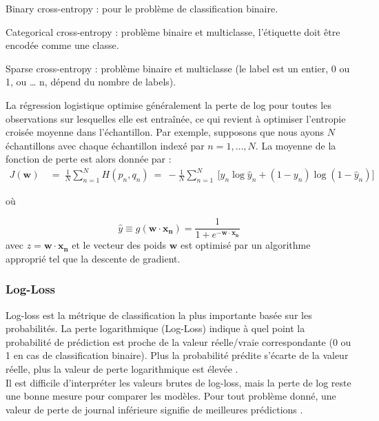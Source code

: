 		\begin{list}{--}{Types d'entropie croisée :}
			\item Binary cross-entropy : pour le problème de classification binaire.
			\item Categorical cross-entropy : problème binaire et multiclasse, l'étiquette doit être encodée comme une classe.
			\item Sparse cross-entropy : problème binaire et multiclasse (le label est un entier, 0 ou 1, ou … n, dépend du nombre de labels).
		\end{list}
		
		
		La régression logistique optimise généralement la perte de log pour toutes les observations sur lesquelles elle est entraînée, ce qui revient à optimiser l'entropie croisée moyenne dans l'échantillon. Par exemple, supposons que nous ayons ${\displaystyle N}$ échantillons avec chaque échantillon indexé par ${\displaystyle n=1,\dots ,N}$. La moyenne de la fonction de perte est alors donnée par :
		\begin{equation}
			{\displaystyle {
				\begin{aligned}
					J(\mathbf {w} )\ &=\ {\frac {1}{N}}\sum _{n=1}^{N}H(p_{n},q_{n})\ =\ -{\frac {1}{N}}\sum _{n=1}^{N}\ {\bigg [}y_{n}\log {\hat {y}}_{n}+(1-y_{n})\log(1-{\hat {y}}_{n}){\bigg ]}\,
				\end{aligned}}}
		\end{equation}
		
		où
	
		
		$$
		{\displaystyle{\hat {y}}\equiv g(\mathbf {w} \cdot \mathbf {x_n} )={\frac {1}{1+e^{-\mathbf {w} \cdot \mathbf {x_n} }}}}
		$$
		avec  $ z = \mathbf {w} \cdot \mathbf {x_n} $ et le vecteur des poids ${\mathbf {w} }$ est optimisé par un algorithme approprié tel que la descente de gradient.
			
		\subsubsection{\textbf{Log-Loss}}
		Log-loss est la métrique de classification la plus importante basée sur les probabilités.
		La perte logarithmique (Log-Loss) indique à quel point la probabilité de prédiction est proche de la valeur réelle/vraie correspondante (0 ou 1 en cas de classification binaire). Plus la probabilité prédite s'écarte de la valeur réelle, plus la valeur de perte logarithmique est élevée \cite{geron2017hands}.\\
		Il est difficile d'interpréter les valeurs brutes de  log-loss, mais la perte de log reste une bonne mesure pour comparer les modèles. Pour tout problème donné, une valeur de perte de journal inférieure signifie de meilleures prédictions \cite{bosman2020visualising}.
		

